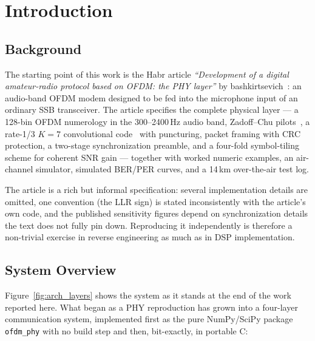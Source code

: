 \section{Introduction}
\label{sec:intro}

\subsection{Background}

The starting point of this work is the Habr article
\textit{``Development of a digital amateur-radio protocol based on OFDM:
the PHY layer''} by bashkirtsevich~\cite{habr_ofdm}: an audio-band OFDM
modem designed to be fed into the microphone input of an ordinary SSB
transceiver.  The article specifies the complete physical layer --- a
128-bin OFDM numerology in the 300--2400\,Hz audio band, Zadoff--Chu
pilots~\cite{chu1972}, a rate-1/3 $K=7$ convolutional
code~\cite{viterbi1967} with puncturing, packet framing with CRC
protection, a two-stage synchronization preamble, and a four-fold
symbol-tiling scheme for coherent SNR gain --- together with worked
numeric examples, an air-channel simulator, simulated BER/PER curves,
and a 14\,km over-the-air test log.

The article is a rich but informal specification: several
implementation details are omitted, one convention (the LLR sign) is
stated inconsistently with the article's own code, and the published
sensitivity figures depend on synchronization details the text does not
fully pin down.  Reproducing it independently is therefore a
non-trivial exercise in reverse engineering as much as in DSP
implementation.

\subsection{System Overview}
\label{sec:system_overview}

Figure~\ref{fig:arch_layers} shows the system as it stands at the end
of the work reported here.  What began as a PHY reproduction has grown
into a four-layer communication system, implemented first as the pure
NumPy/SciPy package \texttt{ofdm\_phy} with no build step and then,
bit-exactly, in portable C:

